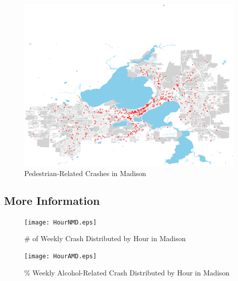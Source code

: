 \documentclass[15pt]{article}
\begin{document}
\begin{figure}[H]
\raggedleft
\includegraphics[height=85mm]{ped.eps}
\caption{Pedestrian-Related Crashes in Madison}
\end{figure}

\newpage
\subsection{More Information}
\begin{figure}[H]
\center
\texttt{[image: HourNMD.eps]}
\caption{\# of Weekly Crash Distributed by Hour in Madison}
\label{sec:WH1}
\end{figure}

\begin{figure}[H]
\center
\texttt{[image: HourAMD.eps]}
\caption{\% Weekly Alcohol-Related Crash Distributed by Hour in Madison}
\end{figure}
\end{document}
